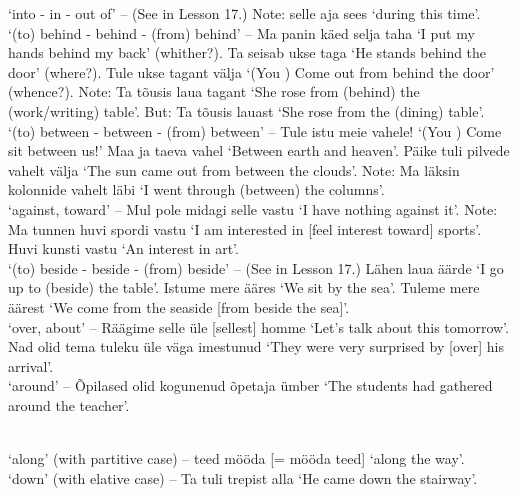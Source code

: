  `into - in - out of' -- (See  in Lesson 17.) Note: selle aja sees `during this time'. \\

 `(to) behind - behind - (from) behind' -- Ma panin käed selja taha `I put my hands behind my back' (whither?). Ta seisab ukse taga `He stands behind the door' (where?). Tule ukse tagant välja `(You \sing) Come out from behind the door' (whence?). Note: Ta tõusis laua tagant `She rose from (behind) the (work/writing) table'. But: Ta tõusis lauast `She rose from the (dining) table'. \\

 `(to) between - between - (from) between' -- Tule istu meie vahele! `(You \sing) Come sit between us!' Maa ja taeva vahel `Between earth and heaven'. Päike tuli pilvede vahelt välja `The sun came out from between the clouds'. Note: Ma läksin kolonnide vahelt läbi `I went through (between) the columns'. \\

 `against, toward' -- Mul pole midagi selle vastu `I have nothing against it'. Note: Ma tunnen huvi spordi vastu `I am interested in [feel interest toward] sports'. Huvi kunsti vastu `An interest in art'. \\

 `(to) beside - beside - (from) beside' -- (See  in Lesson 17.) Lähen laua äärde `I go up to (beside) the table'. Istume mere ääres `We sit by the sea'. Tuleme mere äärest `We come from the seaside [from beside the sea]'. \\

 `over, about' -- Räägime selle üle [sellest] homme `Let's talk about this tomorrow'. Nad olid tema tuleku üle väga imestunud `They were very surprised by [over] his arrival'. \\

 `around' -- Õpilased olid kogunenud õpetaja ümber `The students had gathered around the teacher'.

\newSection \label{section-402}  \\

 `along' (with partitive case) -- teed mööda [= mööda teed] `along the way'. \\

 `down' (with elative case) -- Ta tuli trepist alla `He came down the stairway'. \\

